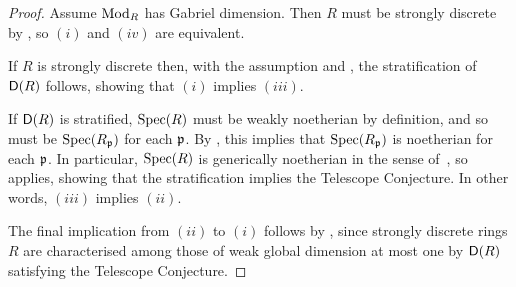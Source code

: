 \documentclass[reqno,a4paper]{amsart}
\begin{document}
\begin{proof}
    Assume $\operatorname{Mod}_R$ has Gabriel dimension. Then $R$ must be strongly discrete by , so $(i)$ and $(iv)$ are equivalent.
    
    If $R$ is strongly discrete then, with the assumption and , the stratification of $\mathsf{D}(R)$ follows, showing that $(i)$ implies $(iii)$.

    If $\mathsf{D}(R)$ is stratified, $\operatorname{Spec}(R)$ must be weakly noetherian by definition, and so must be $\operatorname{Spec}(R_{\mathfrak{p}})$ for each $\mathfrak{p}$. By , this implies that $\operatorname{Spec}(R_{\mathfrak{p}})$ is noetherian for each $\mathfrak{p}$. In particular, $\operatorname{Spec}(R)$ is generically noetherian in the sense of~\cite[Definition~9.5]{bhs23}, so~\cite[Theorem~9.11]{bhs23} applies, showing that the stratification implies the Telescope Conjecture.
    In other words, $(iii)$ implies $(ii)$.
    
    The final implication from $(ii)$ to $(i)$ follows by \cite[\S 7]{gldm1}, since strongly discrete rings $R$ are characterised among those of weak global dimension at most one by $\mathsf{D}(R)$ satisfying the Telescope Conjecture.
\end{proof}

\end{document}
